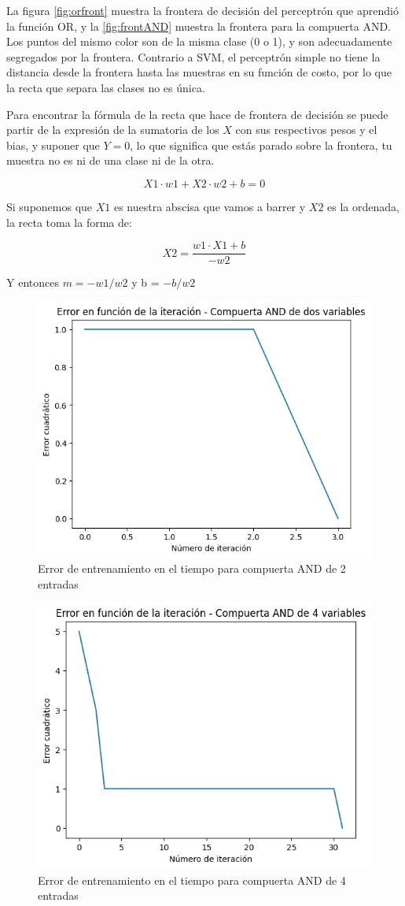 \documentclass[11pt]{article} %
\begin{document}
La figura \ref{fig:orfront} muestra la frontera de decisión del perceptrón que aprendió la función OR, y la \ref{fig:frontAND} muestra la frontera para la compuerta AND. Los puntos del mismo color son de la misma clase (0 o 1), y son adecuadamente segregados por la frontera. Contrario a SVM, el perceptrón simple no tiene la distancia desde la frontera hasta las muestras en su función de costo, por lo que la recta que separa las clases no es única.

Para encontrar la fórmula de la recta que hace de frontera de decisión se puede partir de la expresión de la sumatoria de los $X$ con sus respectivos pesos y el bias, y suponer que $Y=0$, lo que significa que estás parado sobre la frontera, tu muestra no es ni de una clase ni de la otra.

$$
X1 \cdot w1 + X2 \cdot w2 + b = 0
$$

Si suponemos que $X1$ es nuestra abscisa que vamos a barrer y $X2$ es la ordenada, la recta toma la forma de:

$$
X2 = \frac{w1 \cdot X1 + b}{-w2}
$$

Y entonces $m=-w1/w2 $ y b = $-b/w2$

\begin{figure}[h!]
	\centering
	\includegraphics[width=0.7\linewidth]{../imgs/ej1/AND2err}
	\caption[]{Error de entrenamiento en el tiempo para compuerta AND de 2 entradas}
	\label{fig:and2err}
\end{figure}


\begin{figure}[h!]
	\centering
	\includegraphics[width=0.7\linewidth]{../imgs/ej1/AND4}
	\caption[]{Error de entrenamiento en el tiempo para compuerta AND de 4 entradas}
	\label{fig:and4}
\end{figure}
\end{document}
